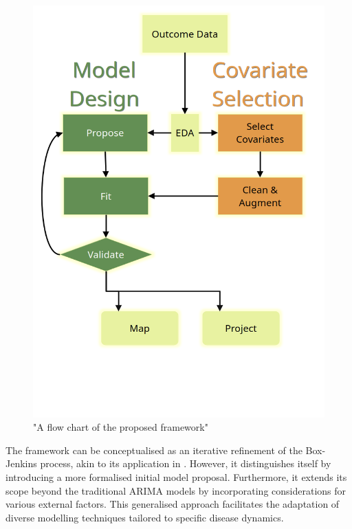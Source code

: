 \documentclass{article}
\begin{document}
\begin{figure}[h!]
    \centering
    \includegraphics[scale=0.22]{images/process flow.png}
    \caption{"A flow chart of the proposed framework"}
    \label{fig:framework}
\end{figure}


The framework can be conceptualised as an iterative refinement of the Box-Jenkins process, akin to its application in \cite{jereModellingEpidemiologicalData2016}. However, it distinguishes itself by introducing a more formalised initial model proposal. Furthermore, it extends its scope beyond the traditional ARIMA models by incorporating considerations for various external factors. This generalised approach facilitates the adaptation of diverse modelling techniques tailored to specific disease dynamics.
\end{document}
